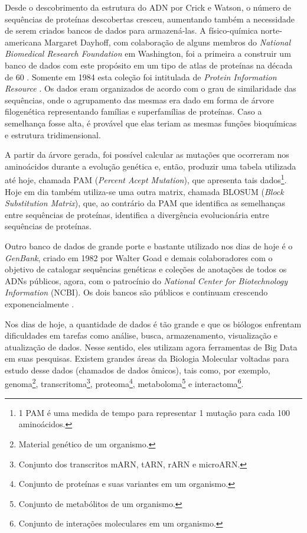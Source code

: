 \indent Desde o descobrimento da estrutura do ADN por Crick e Watson, o número de sequências de proteínas descobertas cresceu, aumentando também a necessidade de serem criados bancos de dados para armazená-las. A físico-química norte-americana Margaret Dayhoff, com colaboração de alguns membros do \textit{National Biomedical Research Foundation} em Washington, foi a primeira a construir um banco de dados com este propósito em um tipo de atlas de proteínas na década de 60 \cite{mount01}. Somente em 1984 esta coleção foi intitulada de \textit{Protein Information Resource} \cite{mount01}. Os dados eram organizados de acordo com o grau de similaridade das sequências, onde o agrupamento das mesmas era dado em forma de árvore filogenética representando famílias e superfamílias de proteínas. Caso a semelhança fosse alta, é provável que elas teriam as mesmas funções bioquímicas e estrutura tridimensional.

\indent A partir da árvore gerada, foi possível calcular as mutações que ocorreram nos aminoácidos durante a evolução genética e, então, produzir uma tabela utilizada até hoje, chamada PAM (\textit{Percent Acept Mutation}), que apresenta tais dados\footnote{1 PAM é uma medida de tempo para representar 1 mutação para cada 100 aminoácidos.}. Hoje em dia também utiliza-se uma outra matrix, chamada BLOSUM (\textit{Block Substitution Matrix}), que, ao contrário da PAM que identifica as semelhanças entre sequências de proteínas, identifica a divergência evolucionária entre sequências de proteínas.

\indent Outro banco de dados de grande porte e bastante utilizado nos dias de hoje é o \textit{GenBank}, criado em 1982 por Walter Goad e demais colaboradores com o objetivo de catalogar sequências genéticas e coleções de anotações de todos os ADNs públicos, agora, com o patrocínio do \textit{National Center for Biotechnology Information} (NCBI). Os dois bancos são públicos e continuam crescendo exponencialmente \cite{mount01}. 


\indent Nos dias de hoje, a quantidade de dados é tão grande e  que os biólogos enfrentam dificuldades em tarefas como análise, busca, armazenamento, visualização e atualização de dados. Nesse sentido, eles utilizam agora ferramentas de Big Data em suas pesquisas. Existem grandes áreas da Biologia Molecular voltadas para estudo desse dados (chamados de dados ômicos), tais como, por exemplo, genoma\footnote{Material genético de um organismo.}, transcritoma\footnote{Conjunto dos transcritos mARN, tARN, rARN e microARN.}, proteoma\footnote{Conjunto de proteínas e suas variantes em um organismo.}, metaboloma\footnote{Conjunto de metabólitos de um organismo.} e interactoma\footnote{Conjunto de interações moleculares em um organismo.}.

